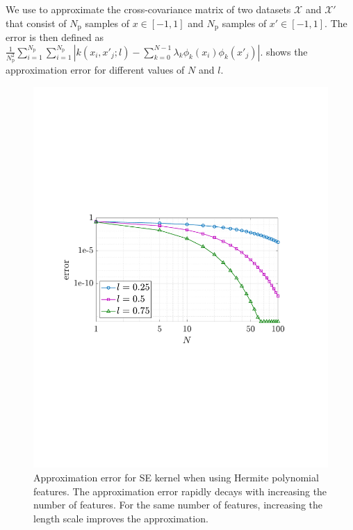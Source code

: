 \documentclass{article}
\begin{document}
We use  to approximate the cross-covariance matrix of two datasets $\mathcal{X}$ and $\mathcal{X}'$ that consist of $N_\text{p}$ samples of $x \in [-1,1]$ and $N_\text{p}$ samples of $x' \in [-1,1]$.
The error is then defined as $\frac{1}{N_\text{p}^2} \sum_{i=1}^{N_\text{p}} \sum_{i=1}^{N_\text{p}}| k(x_i,x'_j;l) -  \sum_{k=0}^{N-1} \lambda_k \phi_k(x_i) \phi_k(x'_j)|$.
 shows the approximation error for different values of $N$ and $l$.

\begin{figure}[t]
	\centering
	\includegraphics[width=0.6\linewidth]{img/approxError.pdf}
	\caption{Approximation error for SE kernel when using Hermite polynomial features. The approximation error rapidly decays with increasing the number of features. For the same number of features, increasing the length scale improves the approximation.}
	\label{fig:approxError}
\end{figure}

%
\end{document}
